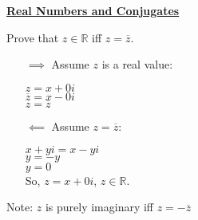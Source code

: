 \documentclass{letter}
\begin{document}
	\underline{\textbf{Real Numbers and Conjugates}}
	
	Prove that $z \in \mathbb{R}$ iff $z = \overline{z}$.
	\begin{itemize}
		\item[$\implies$] Assume $z$ is a real value:
		
		$z = x + 0i$\\
		$\overline{z} = x - 0i$\\
		$z = \overline{z}$
		\item[$\impliedby$] Assume $z = \overline{z}$:
		
		$x + yi = x-yi$\\
		$y = -y$\\
		$y = 0$\\
		So, $z = x + 0i$, $z \in \mathbb{R}$.
	\end{itemize}
	
	Note: $z$ is purely imaginary iff $z = -\overline{z}$
\end{document}
